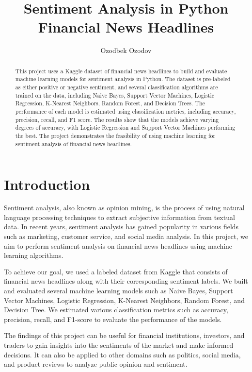 \documentclass{article}
\title{Sentiment Analysis in Python Financial News Headlines}
\author{Ozodbek Ozodov}
\begin{document}
\maketitle

\begin{abstract}
This project uses a Kaggle dataset of financial news headlines to build and evaluate machine learning models for 
sentiment analysis in Python. The dataset is pre-labeled as either positive or negative sentiment, and several 
classification algorithms are trained on the data, including Naive Bayes, Support Vector Machines, Logistic Regression,
K-Nearest Neighbors, Random Forest, and Decision Trees. The performance of each model is estimated using 
classification metrics, including accuracy, precision, recall, and F1 score. The results show that the models 
achieve varying degrees of accuracy, with Logistic Regression and Support Vector Machines performing the best. 
 The project demonstrates the feasibility of using machine learning for sentiment analysis of financial news headlines.
\end{abstract}

\section{Introduction}
Sentiment analysis, also known as opinion mining, is the process of using natural language processing techniques to extract subjective information from textual data. In recent years, sentiment analysis has gained popularity in various fields such as marketing, customer service, and social media analysis. In this project, we aim to perform sentiment analysis on financial news headlines using machine learning algorithms.

To achieve our goal, we used a labeled dataset from Kaggle that consists of financial news headlines along with their corresponding sentiment labels. We built and evaluated several machine learning models such as Naive Bayes, Support Vector Machines, Logistic Regression, K-Nearest Neighbors, Random Forest, and Decision Tree. We estimated various classification metrics such as accuracy, precision, recall, and F1-score to evaluate the performance of the models.

The findings of this project can be useful for financial institutions, investors, and traders to gain insights into the sentiments of the market and make informed decisions. It can also be applied to other domains such as politics, social media, and product reviews to analyze public opinion and sentiment.
\end{document}
